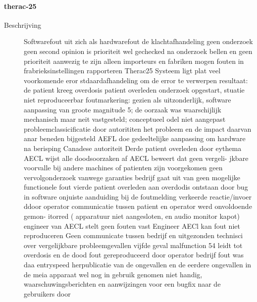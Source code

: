 \cite{catsr25022009Boeing737AmsterdamCrash}

\cite{zuilen23022019Tijdlijnpoldercrash}
\cite{wikinews04032009techfoutailines1951}
\cite{luchtvaartnieuws21012020boeing737conclusies}
\cite{adformatie280220209communicatiegebreken}
\cite{spinnael25022009onderzoekpolderbaancrash}
\cite{crashTurkishAirlines}
\cite{flightradar24}
\cite{flightstatstracker}


\paragraph{therac-25}


\begin{description}
	\item[Beschrijving]
	
	Softwarefout uit zich als hardwarefout de klachtafhandeling geen onderzoek geen second opinion is prioriteit wel 
	gechecked na onderzoek bellen en geen prioriteit aanwezig te zijn alleen importeurs en fabriken mogen fouten 
	in frabrieksinstellingen rapporteren 
	Therac25 Systeem ligt plat veel voorkomende eror stdaardafhandeling om de error te verwerpen resultaat: 
	de patient kreeg overdosis patient overleden onderzoek opgestart, stuatie niet reproduceerbar foutmarkering: 
	gezien als uitzonderlijk, software aanpassing van groote magnitude 5; de oorzaak was waarschijlijk mechanisch 
	maar neit vastgesteld; conceptueel odel niet aangepast probleemclassicificatie door autorititen het probleem 
	en de impact daarvan anar beneden bijgesteld AEFL doe gedeeltelijke aanpassing om hardware na berisping 
	Canadese autoriteit 
	Derde patient overleden door eythema AECL wijst alle doodsoorzaken af AECL beweert dat geen vergeli- 
	jkbare voorvalle bij andere machines of patienten zijn voorgekomen geen vervolgonderzoek vanwege garanties 
	bedrijf gaat uit van geen mogelijke functionele fout 
	vierde patient overleden aan overdodis ontstaan door bug in software onjuiste aanduiding bij de foutmelding 
	verkeerde reactie/invoer ddoor operator communicatie tussen patient en operator werd onvoldoende gemon- 
	itorred ( apparatuur niet aangesloten, en audio monitor kapot) engineer van AECL stelt geen fouten vast 
	Engineer AECl kan fout niet reproduceren Geen communicate tussen bedrijf en uitgezonden technisci over 
	vergelijkbare probleemgevallen 
	vijfde geval malfunction 54 leidt tot overdosis en de dood fout gereproduceerd door operator bedrijf fout 
	was daa entryspeed herpublicatie van de ongevallen en de eerdere ongevallen in de meia apparaat wel nog in 
	gebruik genomen niet handig, waarschuwingsberichten en aanwijzingen voor een bugfix naar de gebruikers door 

\end{description}
